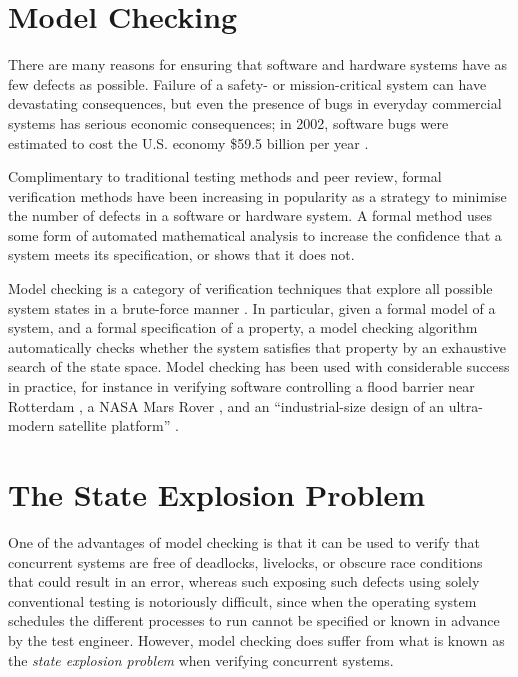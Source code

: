 \documentclass[12pt,a4paper,twoside,openright]{report}
\begin{document}
\section{Model Checking}

There are many reasons for ensuring that
software and hardware systems have as
few defects as possible. Failure of a
safety- or mission-critical system can
have devastating consequences, but even the
presence of bugs in everyday commercial systems has
serious economic consequences; in 2002,
software bugs were estimated to cost
the U.S. economy \$59.5 billion per year \cite{tass02}.

Complimentary to traditional testing methods
and peer review, formal verification methods have been
increasing in popularity as a strategy
to minimise the number of defects in a
software or hardware system. A formal
method uses some form of automated
mathematical analysis to increase
the confidence that a system meets its
specification, or shows that it does not.

Model checking is a category of
verification techniques
that explore all possible system states in a
brute-force manner \cite{bai08}. In particular,
given a formal model of a system, and a
formal specification of a property, a model
checking algorithm automatically checks whether the
system satisfies that property by an
exhaustive search of the state space.
Model checking has been used with considerable
success in practice, for instance in verifying
software controlling a flood barrier near
Rotterdam \cite{kars96},
a NASA Mars Rover \cite{brat04},
and an ``industrial-size design of an
ultra-modern satellite platform'' \cite{est12}.

\section{The State Explosion Problem}

One of the advantages of model checking is
that it can be used to verify that concurrent
systems are free of deadlocks, livelocks, or
obscure race conditions that could result in
an error, whereas such exposing such defects
using solely conventional testing is notoriously
difficult, since when the operating system
schedules the different processes to run
cannot be specified or known in advance by the
test engineer. However, model checking does
suffer from what is known as the
\textit{state explosion problem} when verifying
concurrent systems.
\end{document}
